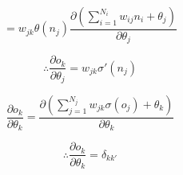 \begin{equation*}
	=w_{jk}\theta \left( n_j \right) \frac { \partial \left( \sum\limits_{i=1}^{N_i} w_{ij} n_i + \theta_j \right) }{ \partial \theta_j }
\end{equation*}

\begin{equation}
	\therefore \frac{\partial o_k}{\partial \theta_j} = w_{jk}\sigma'(n_j)
\end{equation}


\begin{equation*}
	\frac{\partial o_k}{\partial \theta_k} = \frac{ \partial \left( \sum \limits_{j=1} ^ {N_j} w_{jk} \sigma (o_j) + \theta _k \right) }{ \partial \theta_k }
\end{equation*}

\begin{equation}
	\therefore \frac{\partial o_k}{\partial \theta_k} = \delta_{kk'}
\end{equation}